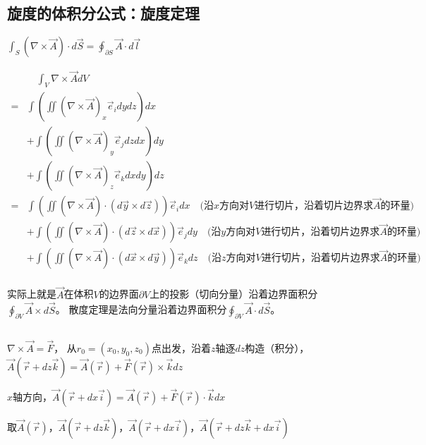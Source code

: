 \subsection{旋度的体积分公式：旋度定理}

$\int_{S} (\nabla \times \vec{A}) \cdot d\vec{S}=\oint_{\partial S} \vec{A}\cdot d\vec{l}$

\begin{equation}
    \begin{split}
        &\quad\int_{V} \nabla \times \vec{A} dV\\
        =& \int (\iint (\nabla \times \vec{A})_{x}\vec{e}_{i} dydz)dx\\
        &+ \int (\iint (\nabla \times \vec{A})_{y}\vec{e}_{j} dzdx)dy\\
        &+ \int (\iint (\nabla \times \vec{A})_{z}\vec{e}_{k} dxdy)dz\\
        =& \int (\iint (\nabla \times \vec{A})\cdot  (d\vec{y}\times d\vec{z}))\vec{e}_{i}dx
        \quad\text{(沿$x$方向对$V$进行切片，沿着切片边界求$\vec{A}$的环量)}\\
        &+ \int (\iint (\nabla \times \vec{A})\cdot  (d\vec{z}\times d\vec{x}))\vec{e}_{j}dy
        \quad\text{(沿$y$方向对$V$进行切片，沿着切片边界求$\vec{A}$的环量)}\\
        &+ \int (\iint (\nabla \times \vec{A})\cdot  (d\vec{x}\times d\vec{y}))\vec{e}_{k}dz
        \quad\text{(沿$z$方向对$V$进行切片，沿着切片边界求$\vec{A}$的环量)}\\
   \end{split}
\end{equation}

实际上就是$\vec{A}$在体积$V$的边界面$\partial V$上的投影（切向分量）沿着边界面积分$\oint_{\partial V} \vec{A}\times d\vec{S}$。
散度定理是法向分量沿着边界面积分$\oint_{\partial V} \vec{A}\cdot d\vec{S}$。


\subsection{}

$\nabla \times \vec{A}=\vec{F}$，
从$r_{0}=(x_{0},y_{0},z_{0})$点出发，沿着$z$轴逐$dz$构造（积分），$\vec{A}(\vec{r}+dz\vec{k})=\vec{A}(\vec{r})+\vec{F}(\vec{r})\times\vec{k}dz$

$x$轴方向，$\vec{A}(\vec{r}+dx\vec{i})=\vec{A}(\vec{r})+\vec{F}(\vec{r})\cdot\vec{k}dx$

取$\vec{A}(\vec{r})$，$\vec{A}(\vec{r}+dz\vec{k})$，$\vec{A}(\vec{r}+dx\vec{i})$，$\vec{A}(\vec{r}+dz\vec{k}+dx\vec{i})$

